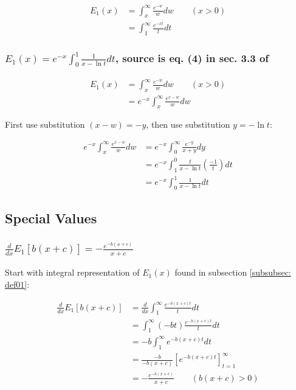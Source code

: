 \documentclass[bibliography=totocnumbered]{scrartcl}
\begin{document}
	\begin{align}
		E_1\left(x\right)&=\int_{x}^{\infty}\frac{e^{-w}}{w}dw\qquad\left(x>0\right)\\
		&=\int_{1}^{\infty}\frac{e^{-xt}}{t}dt
	\end{align}
	
	\subsubsection[Integral representation not involving exp(x) in the integral]{$E_1\left(x\right)=e^{-x}\int_{0}^{1}\frac{1}{x-\ln{t}}dt$, source is eq. (4) in sec. 3.3 of \cite{geller1969table}}
	\label{subsubsec: intrep01}
	\begin{align}
		E_1\left(x\right)&=\int_{x}^{\infty}\frac{e^{-w}}{w}dw\qquad\left(x>0\right)\\
		&=e^{-x}\int_{x}^{\infty}\frac{e^{x-w}}{w}dw
	\end{align}
	
	First use substitution $\left(x-w\right)=-y$, then use substitution $y=-\ln{t}$:
	
	\begin{align}
		e^{-x}\int_{x}^{\infty}\frac{e^{x-w}}{w}dw&=e^{-x}\int_{0}^{\infty}\frac{e^{-y}}{x+y}dy\\
		&=e^{-x}\int_{1}^{0}\frac{t}{x-\ln{t}}\left(\frac{-1}{t}\right)dt\\
		&=e^{-x}\int_{0}^{1}\frac{1}{x-\ln{t}}dt
	\end{align}
	
	\subsection{Special Values}
	
	\subsubsection[A derivative of E1]{$\frac{d}{dx}E_1\left[b\left(x+c\right)\right]=-\frac{e^{-b\left(x+c\right)}}{x+c}$}
	\label{subsubsec: specval_deriv}
	
	Start with integral representation of $E_1\left(x\right)$ found in subsection \ref{subsubsec: def01}:
	
	\begin{align}
		\frac{d}{dx}E_1\left[b\left(x+c\right)\right]&=\frac{d}{dx}\int_{1}^{\infty}\frac{e^{-b\left(x+c\right)t}}{t}dt\\
		&=\int_{1}^{\infty}\left(-bt\right)\frac{e^{-b\left(x+c\right)t}}{t}dt\\
		&=-b\int_{1}^{\infty}e^{-b\left(x+c\right)t}dt\\
		&=\frac{-b}{-b\left(x+c\right)}\left[e^{-b\left(x+c\right)t}\right]^{\infty}_{t=1}\\
		&=-\frac{e^{-b\left(x+c\right)}}{x+c}\qquad\left(b\left(x+c\right)>0\right)
	\end{align}
	
\end{document}
